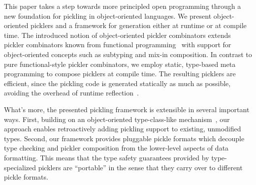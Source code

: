 \documentclass[preprint,10pt]{sigplanconf}
\theoremstyle{definition}
\theoremstyle{definition}
\begin{document}
This paper takes a step towards more principled open programming through a new
foundation for pickling in object-oriented languages. We present object-oriented
picklers and a framework for generation either at runtime or at
compile time. The introduced notion of object-oriented pickler combinators
extends pickler combinators known from functional
programming~\cite{Kennedy2004} with support for object-oriented concepts such
as subtyping and mix-in composition. In contrast to pure functional-style
pickler combinators, we employ static, type-based meta programming to compose
picklers at compile time. The resulting picklers are efficient, since the
pickling code is generated statically as much as possible, avoiding the
overhead of runtime reflection~\cite{Gil2008,Dubochet2011}.

What's more, the presented pickling framework is extensible in several
important ways. First, building on an object-oriented type-class-like
mechanism~\cite{Oliveira2010}, our approach enables retroactively adding
pickling support to existing, unmodified types. Second, our framework provides
pluggable pickle formats which decouple type checking and pickler composition
from the lower-level aspects of data formatting. This means that the type
safety guarantees provided by type-specialized picklers are ``portable'' in
the sense that they carry over to different pickle formats.
\end{document}
